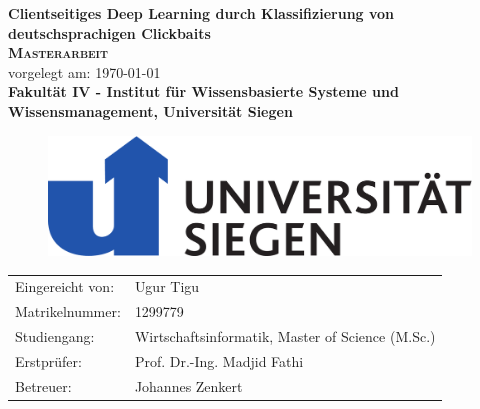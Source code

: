 \documentclass[
        ngerman,
        paper=a4,
        numbers=noendperiod,
]{scrreprt}
\begin{document}
\begin{titlepage}
    \begin{center}
    \huge \textbf{\textsf{Clientseitiges Deep Learning durch Klassifizierung von deutschsprachigen Clickbaits}} \\
    \vspace{1cm}
    \LARGE\textbf{\textsc{Masterarbeit}}\\
    \vspace{1cm}
    \normalsize
    vorgelegt am: \today \\
    \vspace{2.5cm}
    \large \textbf{Fakultät IV - 
Institut für Wissensbasierte
Systeme und Wissensmanagement, Universität Siegen
}
\linebreak
\linebreak
\begin{figure}[H]
    \centering\includegraphics[width=0.4\linewidth]{imageuni.pdf}
    \label{fig:Unilabel}
\end{figure}
    \end{center}
    \vspace{3cm}
    \begin{center}
 \normalsize{
    \begin{tabular}{ll}
    	Eingereicht von: & {Ugur Tigu} \\
    	Matrikelnummer: & {1299779} \\
    	Studiengang: & Wirtschaftsinformatik, Master of Science (M.Sc.)\\
	Erstprüfer: & Prof. Dr.-Ing. Madjid Fathi \\
	Betreuer: &   Johannes Zenkert\\
    \end{tabular}\\
    }
\end{center}
\end{titlepage}
\setcounter{page}{0}
\tableofcontents
\clearpage 
{}
\listoffigures
\clearpage 
{}
\listoftables
\clearpage 
\end{document}
